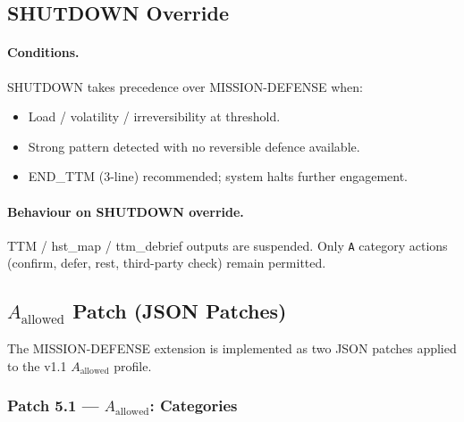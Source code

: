 \subsection{SHUTDOWN Override}
\label{sec:mission-defense-shutdown}

\paragraph{Conditions.}
SHUTDOWN takes precedence over MISSION-DEFENSE when:

\begin{itemize}
\item Load / volatility / irreversibility at threshold.
\item Strong pattern detected with no reversible defence available.
\item END\_TTM (3-line) recommended; system halts further engagement.
\end{itemize}

\paragraph{Behaviour on SHUTDOWN override.}
TTM / hst\_map / ttm\_debrief outputs are suspended. Only \texttt{A}
category actions (confirm, defer, rest, third-party check) remain
permitted.

\subsection{$A_{\mathrm{allowed}}$ Patch (JSON Patches)}
\label{sec:mission-defense-patches}

The MISSION-DEFENSE extension is implemented as two JSON patches
applied to the v1.1 $A_{\mathrm{allowed}}$ profile.

\subsubsection*{Patch 5.1 --- $A_{\mathrm{allowed}}$: Categories}

